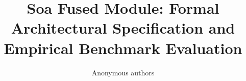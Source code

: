 \title{\textbf{Soa Fused Module: Formal Architectural Specification and Empirical Benchmark Evaluation}}

\author{Anonymous authors}
